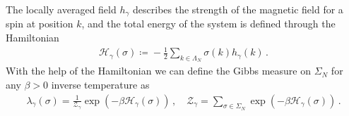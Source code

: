 \documentclass{report}
\DeclareMathOperator{\DefiningEquality}{\coloneqq}
\theoremstyle{remark}
\theoremstyle{definition}
\begin{document}
The locally averaged field $h_\gamma$ describes the strength of the magnetic field for a spin at position $k$, and the total energy of the system is defined through the Hamiltonian \begin{align}
  \mathcal{H}_\gamma(\sigma) \DefiningEquality -\frac{1}{2}\sum_{k\in \Lambda_N} \sigma(k) h_\gamma(k)\,.
\end{align} With the help of the Hamiltonian we can define the Gibbs measure on $\Sigma_N$ for any $\beta > 0$ inverse temperature as \begin{align}
  \lambda_\gamma(\sigma) = \frac{1}{\mathcal{Z}_\gamma}\exp{\left(-\beta \mathcal{H}_\gamma(\sigma)\right)}\,,\quad \mathcal{Z}_\gamma = \sum_{\sigma \in \Sigma_N} \exp{\left(-\beta \mathcal{H}_\gamma(\sigma)\right)}\,.
\end{align}
\end{document}
